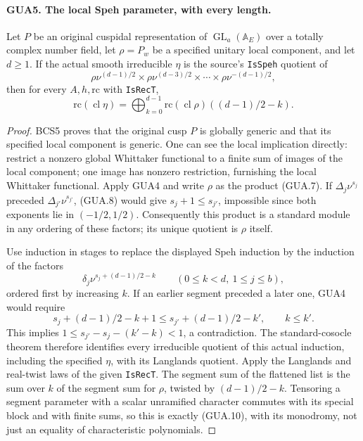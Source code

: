 \documentclass[11pt,a4paper]{article}
\numberwithin{equation}{section}
\theoremstyle{remark}\newtheorem{remark}[theorem]{Remark}
\begin{document}
\paragraph{GUA5. The local Speh parameter, with every length.}
\label{claim:GUA5}
Let $P$ be an original cuspidal representation of
$\operatorname{GL}_a(\mathbb A_E)$ over a totally complex
number field, let $\rho=P_w$ be a specified unitary local
component, and let $d\geq1$.  If the actual smooth
irreducible $\eta$ is the source's \texttt{Is\allowbreak Speh}
quotient of
\[
           \rho\nu^{(d-1)/2}\times\rho\nu^{(d-3)/2}
                                  \times\cdots\times\rho\nu^{-(d-1)/2},
\]
then for every $A,h,\mathrm{rc}$ with \texttt{Is\allowbreak Rec\allowbreak T},
\[
 \mathrm{rc}(\operatorname{cl}\eta)
       =\bigoplus_{k=0}^{d-1}
          \mathrm{rc}(\operatorname{cl}\rho)((d-1)/2-k).
                                                        \tag{GUA.10}
\]
\begin{proof}
BCS5 proves that the original cusp $P$ is globally generic
and that its specified local component is generic.
One can see the local implication directly: restrict a
nonzero global Whittaker functional to a finite sum of
images of the local component; one image has nonzero
restriction, furnishing the local Whittaker functional.
Apply GUA4 and write $\rho$ as the product (GUA.7).
If $\Delta_j\nu^{s_j}$ preceded
$\Delta_{j'}\nu^{s_{j'}}$, (GUA.8) would give
$s_j+1\leq s_{j'}$, impossible since both exponents
lie in $(-1/2,1/2)$.  Consequently this product is a
standard module in any ordering of these factors; its
unique quotient is $\rho$ itself.

Use induction in stages to replace the displayed Speh
induction by the induction of the factors
\[
       \delta_j\nu^{s_j+(d-1)/2-k}
                  \qquad(0\leq k<d,\ 1\leq j\leq b),
\]
ordered first by increasing $k$.  If an earlier segment
preceded a later one, GUA4 would require
\[
 s_j+(d-1)/2-k+1
                  \leq s_{j'}+(d-1)/2-k',\qquad k\leq k'.
\]
This implies $1\leq s_{j'}-s_j-(k'-k)<1$, a
contradiction.  The standard-cosocle theorem therefore
identifies every irreducible quotient of this actual
induction, including the specified $\eta$, with its
Langlands quotient.  Apply the Langlands and real-twist
laws of the given \texttt{Is\allowbreak Rec\allowbreak T}.  The segment sum of
the flattened list is the sum over $k$ of the segment
sum for $\rho$, twisted by $(d-1)/2-k$.
Tensoring a segment parameter with a scalar unramified
character commutes with its special block and with finite
sums, so this is exactly (GUA.10), with its monodromy,
not just an equality of characteristic polynomials.
\end{proof}
\end{document}
